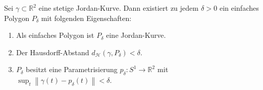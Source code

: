 \begin{satz}
    Sei $\gamma \subset \mathbb{R}^2$ eine stetige Jordan-Kurve. Dann existiert zu jedem $\delta > 0$ ein einfaches Polygon $P_{\delta}$ mit folgenden Eigenschaften:
    \begin{enumerate}
        \item Als einfaches Polygon ist $P_{\delta}$ eine Jordan-Kurve.
        \item Der Hausdorff-Abstand $d_{\mathcal{H}}(\gamma, P_{\delta}) < \delta$.
        \item $P_{\delta}$ besitzt eine Parametrisierung $p_{\delta} : S^1 \to \mathbb{R}^2$ mit $\sup_{t} \left\| \gamma(t) - p_{\delta}(t) \right\| < \delta$.
    \end{enumerate}
\end{satz}

